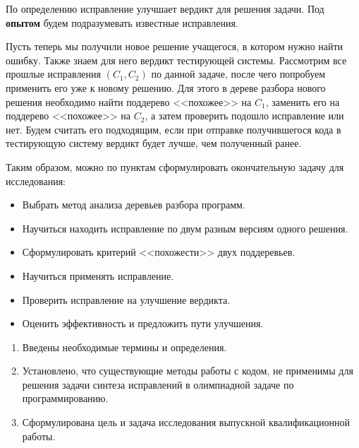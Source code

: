 По определению исправление улучшает вердикт для решения задачи. Под \textbf{опытом} будем подразумевать известные исправления.

Пусть теперь мы получили новое решение учащегося, в котором нужно найти ошибку. Также знаем для него вердикт тестирующей системы. 
Рассмотрим все прошлые исправления $(C_1, C_2)$ по данной задаче, после чего попробуем применить его уже к новому решению. 
Для этого в дереве разбора нового решения необходимо найти поддерево <<похожее>> на $C_1$, заменить его на поддерево
<<похожее>> на $C_2$, а затем проверить подошло исправление или нет. Будем считать его подходящим, если при отправке
получившегося кода в тестирующую систему вердикт будет лучше, чем полученный ранее.

Таким образом, можно по пунктам сформулировать окончательную задачу для исследования:
\begin{itemize}
    \item Выбрать метод анализа деревьев разбора программ.
    \item Научиться находить исправление по двум разным версиям одного решения.
    \item Сформулировать критерий <<похожести>> двух поддеревьев.
    \item Научиться применять исправление.
    \item Проверить исправление на улучшение вердикта.
    \item Оценить эффективность и предложить пути улучшения.
\end{itemize}

\chapterconclusion

\begin{enumerate}
    \item Введены необходимые термины и определения.
    \item Установлено, что существующие методы работы с кодом, не применимы для решения задачи синтеза исправлений 
        в олимпиадной задаче по программированию.
    \item Сформулирована цель и задача исследования выпускной квалификационной работы.
\end{enumerate}

